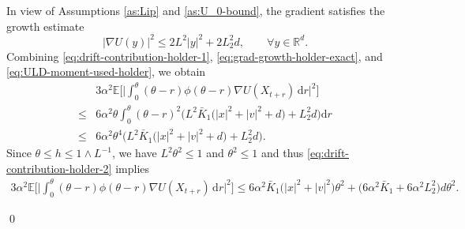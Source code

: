 \documentclass[12pt]{article}
\numberwithin{equation}{section}
\renewenvironment{proof}%
  {\begin{trivlist}%
   \item[]\ignorespaces}%
  {\qed\end{trivlist}}
\newcommand{\dd}{\mathrm{d}}
\begin{document}
\begin{proof}
\begin{equation}
\end{equation}
In view of Assumptions \ref{as:Lip} and \ref{as:U_0-bound}, the gradient satisfies the growth estimate
\begin{equation}
\label{eq:grad-growth-holder-exact}
|\nabla U(y)|^2
\leq
2L^2|y|^2
+
2L_2^2d,
\qquad
\forall y\in\mathbb R^d .
\end{equation}
Combining \eqref{eq:drift-contribution-holder-1}, \eqref{eq:grad-growth-holder-exact}, and \eqref{eq:ULD-moment-used-holder}, we obtain
\begin{equation}
\label{eq:drift-contribution-holder-2}
\begin{aligned}
&
3\alpha^2
\mathbb E
\Big[
\Big|
\int_0^\theta
(\theta-r)\phi(\theta-r)
\nabla U(X_{t+r})\,\dd r
\Big|^2
\Big]
\\
\leq&
6\alpha^2\theta
\int_0^\theta
(\theta-r)^2
\Big(
L^2\bar K_1
\big(
|x|^2+|v|^2+d
\big)
+
L_2^2d
\Big)\dd r
\\
\leq&
6\alpha^2\theta^4
\Big(
L^2\bar K_1
\big(
|x|^2+|v|^2+d
\big)
+
L_2^2d
\Big).
\end{aligned}
\end{equation}
Since $\theta\leq h\leq 1\wedge L^{-1}$, we have $L^2\theta^2\leq1$ and $\theta^2\leq1$ and thus \eqref{eq:drift-contribution-holder-2} implies
\begin{equation}
\label{eq:drift-contribution-holder-final}
\begin{aligned}
3\alpha^2
\mathbb E
\Big[
\Big|
\int_0^\theta
(\theta-r)\phi(\theta-r)
\nabla U(X_{t+r})\,\dd r
\Big|^2
\Big]
\leq
6\alpha^2\bar K_1
\big(
|x|^2+|v|^2
\big)\theta^2
+
\big(
6\alpha^2 \bar K_1
+
6\alpha^2L_2^2
\big)d\theta^2 .
\end{aligned}
\end{equation}


\end{proof}
\end{document}

